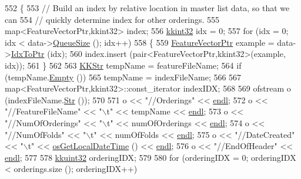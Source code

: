 \begin{DoxyCode}
552 \{
553   \textcolor{comment}{// Build an index by relative location in master list data, so that we can }
554   \textcolor{comment}{// quickly determine index for other orderings.}
555   map<FeatureVectorPtr,kkint32> index;
556   \hyperlink{namespace_k_k_b_a8fa4952cc84fda1de4bec1fbdd8d5b1b}{kkint32}  idx = 0;
557   \textcolor{keywordflow}{for}  (idx = 0;  idx < data->\hyperlink{class_k_k_b_1_1_k_k_queue_a1dab601f75ee6a65d97f02bddf71c40d}{QueueSize} ();  idx++)
558   \{
559     \hyperlink{class_k_k_m_l_l_1_1_feature_vector}{FeatureVectorPtr}  example = data->\hyperlink{class_k_k_b_1_1_k_k_queue_acce2bdd8b3327e38266cf198382cd852}{IdxToPtr} (idx);
560     index.insert (pair<FeatureVectorPtr,kkint32>(example, idx));
561   \}
562 
563   \hyperlink{class_k_k_b_1_1_k_k_str}{KKStr}  tempName = featureFileName;
564   \textcolor{keywordflow}{if}  (tempName.\hyperlink{class_k_k_b_1_1_k_k_str_ac69942f73fffd672ec2a6e1c410afdb6}{Empty} ())
565     tempName = indexFileName;
566 
567   map<FeatureVectorPtr,kkint32>::const\_iterator  indexIDX;
568 
569   ofstream  o (indexFileName.\hyperlink{class_k_k_b_1_1_k_k_str_ad574e6c0fe7f6ce1ba3ab0a8ce2fbd52}{Str} ());
570 
571   o << \textcolor{stringliteral}{"//Orderings"}                                        << \hyperlink{namespace_k_k_b_ad1f50f65af6adc8fa9e6f62d007818a8}{endl};
572   o << \textcolor{stringliteral}{"//FeatureFileName"} << \textcolor{stringliteral}{"\(\backslash\)t"} << tempName              << \hyperlink{namespace_k_k_b_ad1f50f65af6adc8fa9e6f62d007818a8}{endl};
573   o << \textcolor{stringliteral}{"//NumOfOrderings"}  << \textcolor{stringliteral}{"\(\backslash\)t"} << numOfOrderings        << \hyperlink{namespace_k_k_b_ad1f50f65af6adc8fa9e6f62d007818a8}{endl};
574   o << \textcolor{stringliteral}{"//NumOfFolds"}      << \textcolor{stringliteral}{"\(\backslash\)t"} << numOfFolds            << \hyperlink{namespace_k_k_b_ad1f50f65af6adc8fa9e6f62d007818a8}{endl};
575   o << \textcolor{stringliteral}{"//DateCreated"}     << \textcolor{stringliteral}{"\(\backslash\)t"} << \hyperlink{namespace_k_k_b_af54c205cde0465bcb2c74f3881a96413}{osGetLocalDateTime} () << 
      \hyperlink{namespace_k_k_b_ad1f50f65af6adc8fa9e6f62d007818a8}{endl};
576   o << \textcolor{stringliteral}{"//EndOfHeader"}                                      << \hyperlink{namespace_k_k_b_ad1f50f65af6adc8fa9e6f62d007818a8}{endl};
577 
578   \hyperlink{namespace_k_k_b_af8d832f05c54994a1cce25bd5743e19a}{kkuint32}  orderingIDX;
579 
580   \textcolor{keywordflow}{for}  (orderingIDX = 0;  orderingIDX < orderings.size ();  orderingIDX++)

\end{DoxyCode}
